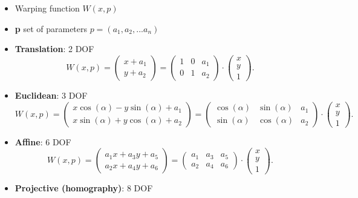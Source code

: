 \documentclass[a4paper,12 pt]{article}
\theoremstyle{definition}
\theoremstyle{remark}
\theoremstyle{definition}
\theoremstyle{definition}
\theoremstyle{definition}
\theoremstyle{definition}
\theoremstyle{remark}
\theoremstyle{remark}
\theoremstyle{definition}
\theoremstyle{definition}
\begin{document}
\begin{itemize}
\item Warping function $W(x,p)$
\item \textbf{p} set of parameters $p = (a_1,a_2,...a_n)$
\item \textbf{Translation}: 2 DOF
\begin{equation}
W(x,p)=\begin{pmatrix}
x+a_1\\
y+a_2
\end{pmatrix}=\begin{pmatrix}
1&0&a_1\\
0&1&a_2
\end{pmatrix}\cdot \begin{pmatrix}
x\\
y\\
1 
\end{pmatrix}.
\end{equation}
\item \textbf{Euclidean}: 3 DOF
\begin{equation}
W(x,p)=\begin{pmatrix}
x\cos(\alpha)-y\sin(\alpha)+a_1\\
x\sin(\alpha)+y\cos(\alpha)+a_2
\end{pmatrix}=\begin{pmatrix}
\cos(\alpha)&\sin(\alpha)&a_1\\
\sin(\alpha)&\cos(\alpha)&a_2
\end{pmatrix}\cdot \begin{pmatrix}
 x\\
 y\\
 1
\end{pmatrix}.
\end{equation}
\item \textbf{Affine}: 6 DOF
\begin{equation}
W(x,p)=\begin{pmatrix}
a_1x+a_3y+a_5\\
a_2x+a_4y+a_6
\end{pmatrix}=\begin{pmatrix}
a_1&a_3&a_5\\
a_2&a_4&a_6
\end{pmatrix}\cdot \begin{pmatrix}
 x\\
 y\\
 1
 \end{pmatrix}.
\end{equation}
\item \textbf{Projective (homography)}: 8 DOF

\end{itemize}
\end{document}
